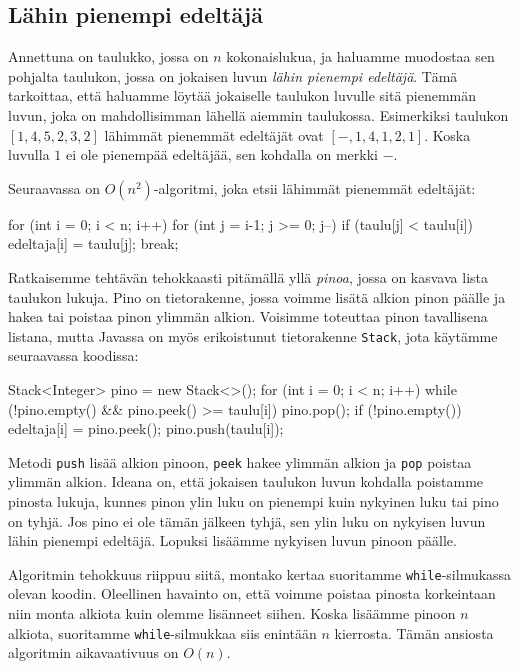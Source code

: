 \subsection{Lähin pienempi edeltäjä}

Annettuna on taulukko, jossa on $n$ kokonaislukua,
ja haluamme muodostaa sen pohjalta taulukon,
jossa on jokaisen luvun \emph{lähin pienempi edeltäjä}.
Tämä tarkoittaa, että haluamme löytää jokaiselle taulukon luvulle
sitä pienemmän luvun, joka on mahdollisimman lähellä aiemmin taulukossa.
Esimerkiksi taulukon $[1,4,5,2,3,2]$
lähimmät pienemmät edeltäjät ovat $[-,1,4,1,2,1]$.
Koska luvulla $1$ ei ole pienempää edeltäjää,
sen kohdalla on merkki $-$.

Seuraavassa on $O(n^2)$-algoritmi, joka etsii
lähimmät pienemmät edeltäjät:

\begin{code}
for (int i = 0; i < n; i++) {
    for (int j = i-1; j >= 0; j--) {
        if (taulu[j] < taulu[i]) {
            edeltaja[i] = taulu[j];
            break;
        }
    }
}
\end{code}

Ratkaisemme tehtävän tehokkaasti pitämällä yllä \emph{pinoa},
jossa on kasvava lista taulukon lukuja.
Pino on tietorakenne, jossa voimme lisätä alkion pinon päälle
ja hakea tai poistaa pinon ylimmän alkion.
Voisimme toteuttaa pinon tavallisena listana,
mutta Javassa on myös erikoistunut tietorakenne \texttt{Stack},
jota käytämme seuraavassa koodissa:

\begin{code}
Stack<Integer> pino = new Stack<>();
for (int i = 0; i < n; i++) {
    while (!pino.empty() && pino.peek() >= taulu[i]) {
        pino.pop();
    }
    if (!pino.empty()) {
        edeltaja[i] = pino.peek();
    }
    pino.push(taulu[i]);
}
\end{code}

Metodi \texttt{push} lisää alkion pinoon,
\texttt{peek} hakee ylimmän alkion ja \texttt{pop}
poistaa ylimmän alkion.
Ideana on, että jokaisen taulukon luvun kohdalla poistamme
pinosta lukuja, kunnes pinon ylin luku on pienempi kuin nykyinen luku
tai pino on tyhjä.
Jos pino ei ole tämän jälkeen tyhjä, sen ylin luku on nykyisen luvun
lähin pienempi edeltäjä.
Lopuksi lisäämme nykyisen luvun pinoon päälle.

Algoritmin tehokkuus riippuu siitä, montako kertaa suoritamme
\texttt{while}-silmukassa olevan koodin.
Oleellinen havainto on, että voimme poistaa pinosta
korkeintaan niin monta alkiota kuin olemme lisänneet siihen.
Koska lisäämme pinoon $n$ alkiota, suoritamme \texttt{while}-silmukkaa
siis enintään $n$ kierrosta.
Tämän ansiosta algoritmin aikavaativuus on $O(n)$.